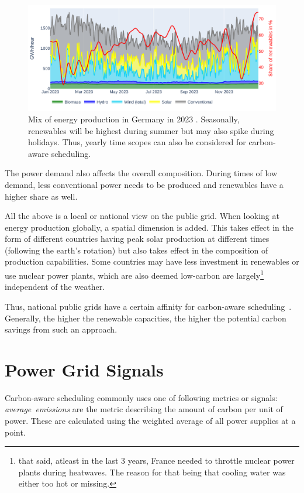 \begin{figure}
    \includegraphics[width=\linewidth]{agorameter/energy_production_year.pdf}
    \caption[short]{Mix of energy production in Germany in 2023 . Seasonally, renewables will be highest during summer but may also spike during holidays. Thus, yearly time scopes can also be considered for carbon-aware scheduling.}
    \label{fig:energy_mix_year}
\end{figure}

The power demand also affects the overall composition. 
During times of low demand, less conventional power needs to be produced and renewables have a higher share as well.

All the above is a local or national view on the public grid. 
When looking at energy production globally, a spatial dimension is added. 
This takes effect in the form of different countries having peak solar production at different times (following the earth's rotation) but also takes effect in the composition of production capabilities.
Some countries may have less investment in renewables or use nuclear power plants, which are also deemed low-carbon are largely\footnote{that said, atleast in the last 3 years, France needed to throttle nuclear power plants during heatwaves.  The reason for that being that cooling water was either too hot or missing. } independent of the weather.

Thus, national public grids have a certain affinity for carbon-aware scheduling~\cite{wiesner_lets_2021}. Generally, the higher the renewable capacities, the higher the potential carbon savings from such an approach. 

\section{Power Grid Signals}
Carbon-aware scheduling commonly uses one of following metrics or signals: \emph{average~emissions} are the metric describing the amount of carbon per unit of power. These are calculated using the weighted average of all power supplies at a point.

